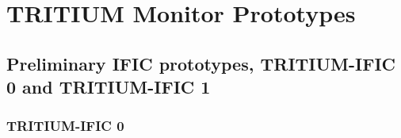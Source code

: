 \documentclass[12pt,a4paper]{book}
\begin{document}
	
					 

\chapter{TRITIUM Monitor Prototypes}\label{chap:Prototypes}	
	
	
	\section[Preliminary Prototypes]{Preliminary IFIC prototypes, TRITIUM-IFIC 0 and TRITIUM-IFIC 1}\label{sec:Preliminary_prototypes}
	
		
		\subsection{TRITIUM-IFIC 0}\label{subsec:TritiumIFIC0}
		
		
\end{document}
